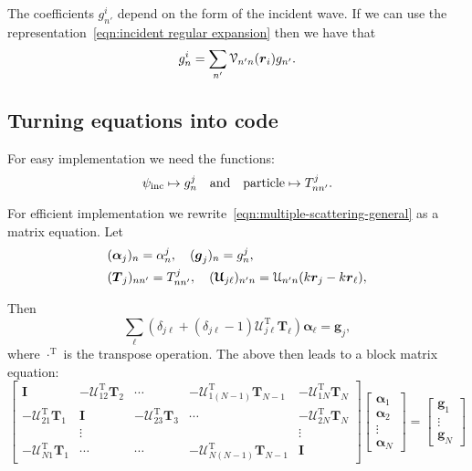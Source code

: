 \documentclass[ 12pt, a4paper]{article}
\renewcommand{\vec}[1]{\boldsymbol{#1}}
\begin{document}
The coefficients $g_{n'}^i$ depend on the form of the incident wave. If we can use the representation~\eqref{eqn:incident regular expansion} then we have that  
\[
  g_{n}^i = \sum_{n'}\mathcal V_{n' n}(\rv_i) g_{n'}.
\]

\subsection{Turning equations into code}
For easy implementation we need the functions:
\[
\psi_{\mathrm{inc}} \mapsto g_n^j \quad \text{and} \quad \text{particle} \mapsto T_{nn'}^j.
\]

For efficient implementation we rewrite~\eqref{eqn:multiple-scattering-general} as a matrix equation. Let
\begin{align}
  &(\vec \alpha_j)_n =  \alpha_n^j, \quad (\vec g_j)_n =  g_n^j,
  \\
  &(\vec T_j)_{nn'} = T_{nn'}^j, \quad (\vec {\mathcal U}_{j \ell})_{n'n} = \mathcal U_{n'n}(k \rv_j - k\rv_\ell),
\end{align}

 Then
\begin{equation}
 \sum_{\ell}(\delta_{j \ell} +  (\delta_{j \ell}-1) \vec {\mathcal U}_{j \ell}^{\mathrm T} \vec T_\ell) \vec \alpha_\ell  =  \vec g_j,
\end{equation}
where $\cdot ^{\mathrm T}$ is the transpose operation. The above then leads to a block matrix equation:
\begin{equation}
  \begin{bmatrix}
    \vec I & - \vec {\mathcal U}_{1 2}^{\mathrm T}\vec T_2 & \cdots & - \vec {\mathcal U}_{1 (N-1)}^{\mathrm T} \vec T_{N-1} & - \vec {\mathcal U}_{1 N}^{\mathrm T} \vec T_N \\
    - \vec {\mathcal U}_{2 1}^{\mathrm T} \vec T_1 & \vec I &  - \vec {\mathcal U}_{2 3}^{\mathrm T} \vec T_3 & \cdots & - \vec {\mathcal U}_{2 N}^{\mathrm T} \vec T_N \\
     & \vdots & & & \vdots \\
     - \vec {\mathcal U}_{N 1}^{\mathrm T} \vec T_1  & \cdots & \cdots & -  \vec {\mathcal U}_{N (N-1)}^{\mathrm T} \vec T_{N-1} & \vec I
  \end{bmatrix}
  \begin{bmatrix}
    \vec \alpha_1 \\
    \vec \alpha_2 \\
    \vdots \\
    \vec \alpha_N
  \end{bmatrix}
   = \begin{bmatrix}
     \vec g_1 \\
     \vdots \\
     \vec g_N
   \end{bmatrix}
\end{equation}
\end{document}
